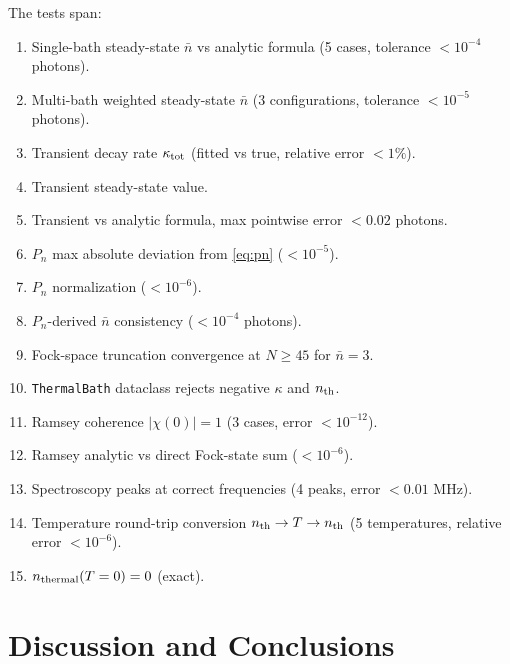\documentclass[11pt,a4paper]{article}
\newcommand{\nbar}{\bar{n}}
\newcommand{\kappat}{\kappa_{\rm tot}}
\begin{document}
The tests span:
\begin{enumerate}
  \item Single-bath steady-state $\nbar$ vs analytic formula (5 cases,
        tolerance $< 10^{-4}$ photons).
  \item Multi-bath weighted steady-state $\nbar$ (3 configurations,
        tolerance $< 10^{-5}$ photons).
  \item Transient decay rate $\kappat$ (fitted vs true, relative error $< 1\%$).
  \item Transient steady-state value.
  \item Transient vs analytic formula, max pointwise error $< 0.02$ photons.
  \item $P_n$ max absolute deviation from \cref{eq:pn} ($< 10^{-5}$).
  \item $P_n$ normalization ($< 10^{-6}$).
  \item $P_n$-derived $\nbar$ consistency ($< 10^{-4}$ photons).
  \item Fock-space truncation convergence at $N \ge 45$ for $\nbar = 3$.
  \item \texttt{ThermalBath} dataclass rejects negative $\kappa$ and $n_{\rm th}$.
  \item Ramsey coherence $|\chi(0)| = 1$ (3 cases, error $< 10^{-12}$).
  \item Ramsey analytic vs direct Fock-state sum ($< 10^{-6}$).
  \item Spectroscopy peaks at correct frequencies (4 peaks, error $< 0.01$ MHz).
  \item Temperature round-trip conversion $n_{\rm th} \to T \to n_{\rm th}$
        (5 temperatures, relative error $< 10^{-6}$).
  \item $n_{\rm thermal}(T=0) = 0$ (exact).
\end{enumerate}

\section{Discussion and Conclusions}
\label{sec:conclusions}
\end{document}
